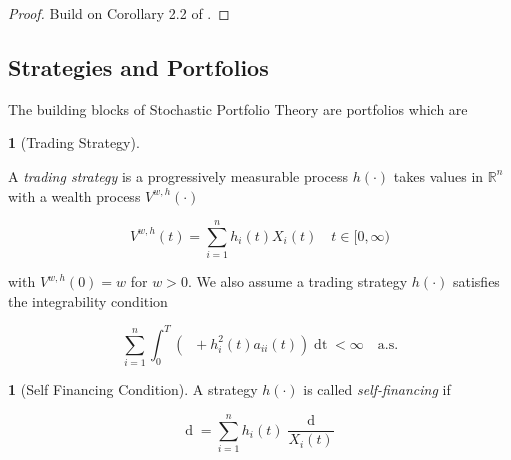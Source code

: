 \documentclass[british]{amsart}
\numberwithin{equation}{section}
\numberwithin{figure}{section}
\theoremstyle{plain}
\theoremstyle{definition}
\newtheorem{defn}[thm]{\protect\definitionname}
\theoremstyle{plain}
\theoremstyle{plain}
\theoremstyle{plain}
\theoremstyle{remark}
\theoremstyle{plain}
\providecommand{\definitionname}{Definition}
\renewcommand{\d}[1]{\mathop{\mathrm{d}{#1}}}
\newcommand{\ranget}{t\in[0,\infty)}
\newcommand{\defeq}{\mathop{\triangleq}}
\newcommand{\almostsurely}{\text{a.s.}}
\newcommand{\abs}[1]{\mathop{|{#1}|}}
\begin{document}
\begin{proof} Build on Corollary 2.2 of \cite{fernholz1999pgf}. \end{proof}

\subsection{Strategies and Portfolios}

The building blocks of Stochastic Portfolio Theory are portfolios which are 


\begin{defn} [Trading Strategy] \label{def:tradingstrategy}

  A \textit{trading strategy} is a progressively measurable process $h(\cdot)$
takes values in $\mathbb{R}^{n}$ with a wealth process $V^{w,h}(\cdot)$ 

  \begin{equation*} V^{w,h}(t) = \sum_{i=1}^{n} h_{i}(t) X_{i}(t) \quad \ranget
\end{equation*}

  with $V^{w,h}(0)=w$ for $w > 0$. We also assume a trading strategy $h(\cdot)$
satisfies the integrability condition

  \begin{equation*} \sum_{i=1}^{n} \int_{0}^{T} \left( \abs{(h_{i}(t)b_{i}(t)} +
h_{i}^2(t)a_{ii}(t) \right) \d{t} < \infty \quad \almostsurely \end{equation*}

\end{defn}

\begin{defn} [Self Financing Condition] \label{def:selffinancingcondition}  A
strategy $h(\cdot)$ is called \textit{self-financing} if 
  
  \begin{equation} \d{V^{w,\pi}(t)} = \sum_{i=1}^{n} h_{i}(t)
\frac{\d{X_{i}(t)}}{X_{i}(t)} \end{equation}

\end{defn}


%
%
%
%
\end{document}
